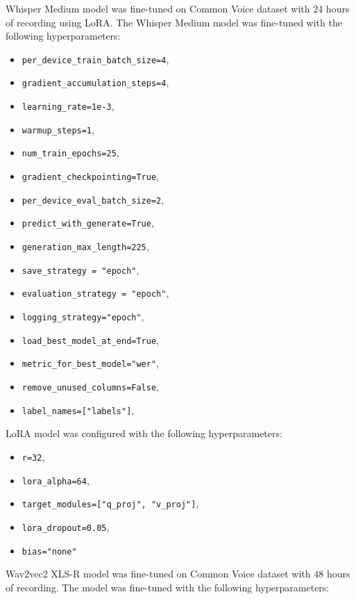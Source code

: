 \documentclass[conference]{IEEEtran}
\begin{document}
\quad \quad Whisper Medium model was fine-tuned on Common Voice dataset with 24 hours of recording using LoRA. The Whisper Medium model was fine-tuned with the following hyperparameters:
\begin{itemize}
    \item \texttt{per\_device\_train\_batch\_size=4},
    \item \texttt{gradient\_accumulation\_steps=4},
    \item \texttt{learning\_rate=1e-3},
    \item \texttt{warmup\_steps=1},
    \item \texttt{num\_train\_epochs=25},
    \item \texttt{gradient\_checkpointing=True},
    \item \texttt{per\_device\_eval\_batch\_size=2},
    \item \texttt{predict\_with\_generate=True},
    \item \texttt{generation\_max\_length=225},
    \item \texttt{save\_strategy = "epoch"},
    \item \texttt{evaluation\_strategy = "epoch"},
    \item \texttt{logging\_strategy="epoch"},
    \item \texttt{load\_best\_model\_at\_end=True},
    \item \texttt{metric\_for\_best\_model="wer"},
    \item \texttt{remove\_unused\_columns=False},  
    \item \texttt{label\_names=["labels"]}, 
    \end{itemize}
    
    \vspace{10pt}
    
    LoRA model was configured with the following hyperparameters:
    
    \begin{itemize}
    \item \texttt{r=32},
    \item \texttt{lora\_alpha=64},
    \item \texttt{target\_modules=["q\_proj", "v\_proj"]},
    \item \texttt{lora\_dropout=0.05},
    \item \texttt{bias="none"}
    \end{itemize}

Wav2vec2 XLS-R model was fine-tuned on Common Voice dataset with 48 hours of recording. The model was fine-tuned with the following hyperparameters:
\end{document}
